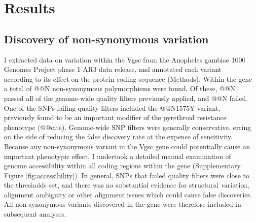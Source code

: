 \documentclass[a4paper,11pt,abstracton,hidelinks]{scrartcl}
\begin{document}
\section*{Results}


\subsection*{Discovery of non-synonymous variation}


%
I extracted data on variation within the Vgsc from the Anopheles gambiae 1000 Genomes Project phase 1 AR3 data release, and annotated each variant according to its effect on the protein coding sequence (Methods).
%
Within the gene a total of @@N non-synonymous polymorphisms were found.
%
Of these, @@N passed all of the genome-wide quality filters previously applied, and @@N failed.
%
One of the SNPs failing quality filters included the @@N1575Y variant, previously found to be an important modifier of the pyrethroid resistance phenotype (@@cite).
%
Genome-wide SNP filters were generally conservative, erring on the side of reducing the false discovery rate at the expense of sensitivity.
%
Because any non-synonymous variant in the Vgsc gene could potentially cause an important phenotypic effect, I undertook a detailed manual examination of genome accessibility within all coding regions within the gene (Supplementary Figure \ref{fig:accessibility}).
%
In general, SNPs that failed quality filters were close to the thresholds set, and there was no substantial evidence for structural variation, alignment ambiguity or other alignment issues which could cause false discoveries.
%
All non-synonymous variants discovered in the gene were therefore included in subsequent analyses.
\end{document}
